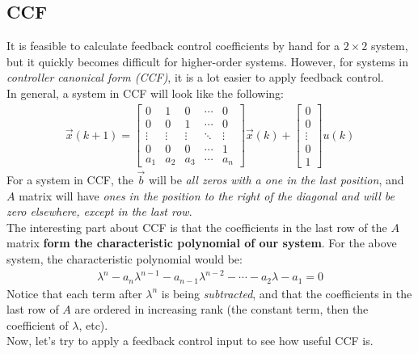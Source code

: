 \subsection*{CCF}
It is feasible to calculate feedback control coefficients by hand for a $2 \times 2$ system, but it quickly becomes difficult for higher-order systems. However, for systems in \textit{controller canonical form (CCF)}, it is a lot easier to apply feedback control. \\
\newline
In general, a system in CCF will look like the following:
\begin{align*}
    \vec{x}(k + 1) = \begin{bmatrix}
        0 & 1 & 0 & \cdots & 0 \\
        0 & 0 & 1 & \cdots & 0 \\
        \vdots & \vdots & \vdots & \ddots & \vdots \\
        0 & 0 & 0 & \cdots & 1 \\
        a_1 & a_2 & a_3 & \cdots & a_n
    \end{bmatrix} \vec{x}(k) + \begin{bmatrix}
        0 \\ 0 \\ \vdots \\ 0 \\ 1
    \end{bmatrix} u(k)
\end{align*}
For a system in CCF, the $\vec{b}$ will be \textit{all zeros with a one in the last position}, and $A$ matrix will have \textit{ones in the position to the right of the diagonal and will be zero elsewhere, except in the last row}. \\
\newline
The interesting part about CCF is that the coefficients in the last row of the $A$ matrix \textbf{form the characteristic polynomial of our system}. 
For the above system, the characteristic polynomial would be:
\begin{align*}
    \lambda^n - a_n \lambda^{n - 1} - a_{n - 1}\lambda^{n - 2} - \cdots - a_2 \lambda - a_1 = 0
\end{align*}
Notice that each term after $\lambda^n$ is being \textit{subtracted}, and that the coefficients in the last row of $A$ are ordered in increasing rank (the constant term, then the coefficient of $\lambda$, etc). \\
\newline
Now, let's try to apply a feedback control input to see how useful CCF is.
